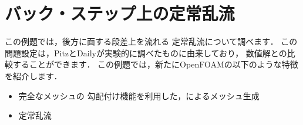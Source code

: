 \section{バック・ステップ上の定常乱流}
\label{sec:3.2}
%
%
この例題では，後方に面する段差上を流れる
%
定常乱流について調べます．
この問題設定は，PitzとDailyが実験的に調べたものに由来しており，
数値解との比較することができます．
この例題では，新たにOpenFOAMの以下のような特徴を紹介します．
\begin{itemize}
 \item 完全なメッシュの
%
 勾配付け機能を利用した，によるメッシュ生成
 \item 定常乱流
\end{itemize}


